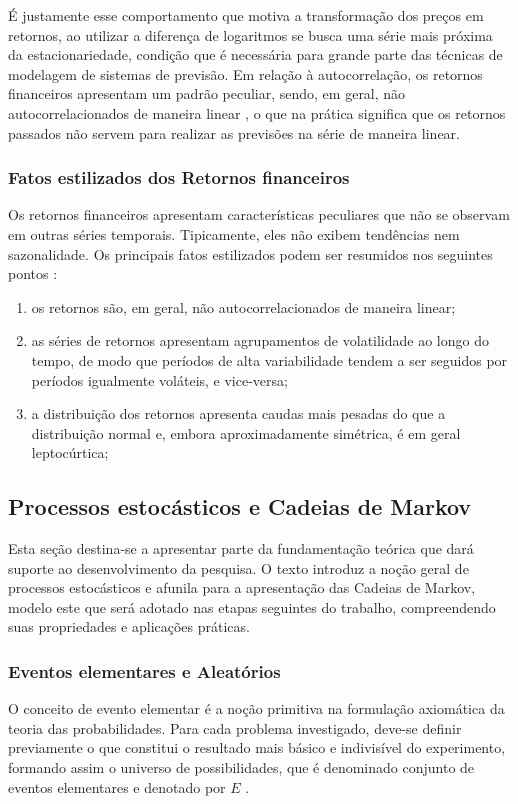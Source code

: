 \documentclass[
    12pt,                %
    openright,           %
    oneside,             %
    a4paper,             %
    english,             %
    brazil               %
]{abntex2}
\begin{document}
É justamente esse comportamento que motiva a transformação dos preços em retornos, ao utilizar a diferença de logaritmos se busca uma série mais próxima da estacionariedade, condição que é necessária para grande parte das técnicas de modelagem de sistemas de previsão. Em relação à autocorrelação, os retornos financeiros apresentam um padrão peculiar, sendo, em geral, não autocorrelacionados de maneira linear \cite{morettin2018analise}, o que na prática significa que os retornos passados não servem para realizar as previsões na série de maneira linear.

\subsubsection{Fatos estilizados dos Retornos financeiros}

Os retornos financeiros apresentam características peculiares que não se observam em outras séries temporais. Tipicamente, eles não exibem tendências nem sazonalidade. Os principais fatos estilizados podem ser resumidos nos seguintes pontos \cite{morettin2018analise}:
\begin{enumerate}
    \item os retornos são, em geral, não autocorrelacionados de maneira linear;
    \item as séries de retornos apresentam agrupamentos de volatilidade ao longo do tempo, de modo que períodos de alta variabilidade tendem a ser seguidos por períodos igualmente voláteis, e vice-versa;
    \item a distribuição dos retornos apresenta caudas mais pesadas do que a distribuição normal e, embora aproximadamente simétrica, é em geral leptocúrtica;
\end{enumerate}

\subsection{Processos estocásticos e Cadeias de Markov}
\label{sec:processos_estocasticos}

Esta seção destina-se a apresentar parte da fundamentação teórica que dará suporte ao desenvolvimento da pesquisa. O texto introduz a noção geral de processos 
estocásticos e afunila para a apresentação das Cadeias de Markov, modelo este que será adotado nas etapas seguintes do trabalho, compreendendo suas propriedades e 
aplicações práticas.

\subsubsection{Eventos elementares e Aleatórios}
O conceito de evento elementar é a noção primitiva na formulação axiomática da teoria das probabilidades. Para cada problema investigado, deve-se definir 
previamente o que constitui o resultado mais básico e indivisível do experimento, formando assim o universo de possibilidades, que é denominado conjunto de 
eventos elementares e denotado por $E$ \cite{FISZ}.
\end{document}
